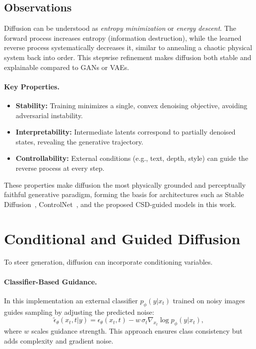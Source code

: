 \subsection*{Observations}

Diffusion can be understood as \textit{entropy minimization} or \textit{energy descent}.  
The forward process increases entropy (information destruction), while the learned reverse process systematically decreases it, similar to annealing a chaotic physical system back into order.  
This stepwise refinement makes diffusion both stable and explainable compared to GANs or VAEs.

\paragraph{Key Properties.}
\begin{itemize}
  \item \textbf{Stability:} Training minimizes a single, convex denoising objective, avoiding adversarial instability.
  \item \textbf{Interpretability:} Intermediate latents correspond to partially denoised states, revealing the generative trajectory.
  \item \textbf{Controllability:} External conditions (e.g., text, depth, style) can guide the reverse process at every step.
\end{itemize}

These properties make diffusion the most physically grounded and perceptually faithful generative paradigm, forming the basis for architectures such as Stable Diffusion~\cite{rombach2022ldm}, ControlNet~\cite{zhang2023controlnet}, and the proposed      CSD-guided models in this work.

\section{Conditional and Guided Diffusion}
\label{sec:conditional_diffusion}

To steer generation, diffusion can incorporate conditioning variables.

\paragraph{Classifier-Based Guidance.}
In this implementation \cite{dhariwal2021diffusion} an external classifier $p_\phi(y|x_t)$ trained on noisy images guides sampling by adjusting the predicted noise:
\[
\tilde{\epsilon}_\theta(x_t,t|y)
=\epsilon_\theta(x_t,t)
- w\,\sigma_t\nabla_{x_t}\log p_\phi(y|x_t),
\]
where $w$ scales guidance strength.  
This approach ensures class consistency but adds complexity and gradient noise.

